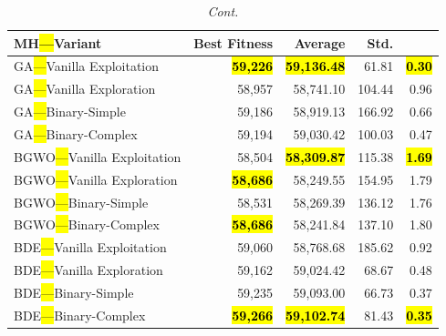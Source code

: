 \documentclass[mathematics,article,accept,moreauthors]{Definitions/mdpi}
\begin{document}
\begin{table}[H]\ContinuedFloat
\caption{\textit{Cont.}}
  \label{tab:calidad_mknapcb2_0}
  \small
  \begin{tabularx}{\textwidth}{lRRRR}
    \toprule
    \textbf{MH\hl{---}Variant} &
    \textbf{Best Fitness} &
    \textbf{Average} &
    \textbf{Std.} &
    \textbf{} \\
    \midrule



    GA\hl{---}Vanilla Exploitation   & \textbf{\hl{59,226}} & \textbf{\hl{59,136.48}} &  61.81 & \textbf{\hl{0.30}} \\
    GA\hl{---}Vanilla Exploration    &          58,957 &         58,741.10 & 104.44 &         0.96 \\
    GA\hl{---}Binary-Simple          &          59,186 &         58,919.13 & 166.92 &         0.66 \\
    GA\hl{---}Binary-Complex         &          59,194 &         59,030.42 & 100.03 &         0.47 \\
    \midrule
    BGWO\hl{---}Vanilla Exploitation &          58,504 & \textbf{\hl{58,309.87}} & 115.38 & \textbf{\hl{1.69}} \\
    BGWO\hl{---}Vanilla Exploration  & \textbf{\hl{58,686}} &         58,249.55 & 154.95 &         1.79 \\
    BGWO\hl{---}Binary-Simple        &          58,531 &         58,269.39 & 136.12 &         1.76 \\
    BGWO\hl{---}Binary-Complex       & \textbf{\hl{58,686}} &         58,241.84 & 137.10 &         1.80 \\
    \midrule
    BDE\hl{---}Vanilla Exploitation  &          59,060 &         58,768.68 & 185.62 &         0.92 \\
    BDE\hl{---}Vanilla Exploration   &          59,162 &         59,024.42 &  68.67 &         0.48 \\
    BDE\hl{---}Binary-Simple         &          59,235 &         59,093.00 &  66.73 &         0.37 \\
    BDE\hl{---}Binary-Complex        & \textbf{\hl{59,266}} & \textbf{\hl{59,102.74}} &  81.43 & \textbf{\hl{0.35}} \\
    \bottomrule
  \end{tabularx}
\end{table}

\vspace{-9pt}
\end{document}
